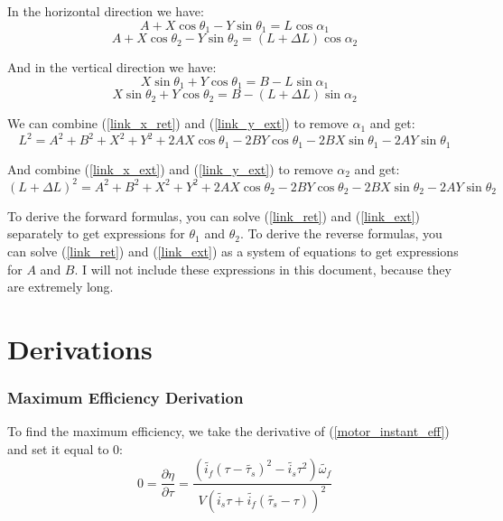 \documentclass[11pt,a4paper,titlepage]{article}
\begin{document}
	In the horizontal direction we have:
	\begin{equation} \label{link_x_ret}
		A + X \cos \theta_1 - Y \sin \theta_1 = L \cos \alpha_1
	\end{equation}
	\begin{equation} \label{link_x_ext}
		A + X \cos \theta_2 - Y \sin \theta_2 = (L + \Delta L) \cos \alpha_2
	\end{equation}
	
	And in the vertical direction we have:
	\begin{equation} \label{link_y_ret}
		X \sin \theta_1 + Y \cos \theta_1 = B - L \sin \alpha_1
	\end{equation}
	\begin{equation} \label{link_y_ext}
		X \sin \theta_2 + Y \cos \theta_2 = B - (L + \Delta L) \sin \alpha_2
	\end{equation}
	
	We can combine (\ref{link_x_ret}) and (\ref{link_y_ext}) to remove $\alpha_1$ and get:
	\begin{equation} \label{link_ret}
		L^2 = A^2 + B^2 + X^2 + Y^2 + 2AX \cos \theta_1 - 2BY \cos \theta_1 - 2BX \sin \theta_1 - 2AY \sin \theta_1
	\end{equation}
	
	And combine (\ref{link_x_ext}) and (\ref{link_y_ext}) to remove $\alpha_2$ and get:
	\begin{equation} \label{link_ext}
		(L + \Delta L)^2 = A^2 + B^2 + X^2 + Y^2 + 2AX \cos \theta_2 - 2BY \cos \theta_2 - 2BX \sin \theta_2 - 2AY \sin \theta_2
	\end{equation}
	
	To derive the forward formulas, you can solve (\ref{link_ret}) and (\ref{link_ext}) separately to get expressions for $\theta_1$ and $\theta_2$. To derive the reverse formulas, you can solve (\ref{link_ret}) and (\ref{link_ext}) as a system of equations to get expressions for $A$ and $B$. I will not include these expressions in this document, because they are extremely long.
	
	\newpage
	\appendix
	\part*{Derivations}
	\section{Maximum Efficiency Derivation} \label{max_eff_appendix}
	To find the maximum efficiency, we take the derivative of (\ref{motor_instant_eff}) and set it equal to 0:
	\begin{equation}
		0 = \frac{\partial \eta}{\partial \tau} = \frac{(\tilde{i_f} (\tau - \tilde{\tau_s})^2 - \tilde{i_s} \tau^2) \tilde{\omega_f}}{V (\tilde{i_s} \tau + \tilde{i_f} (\tilde{\tau_s} - \tau))^2}
	\end{equation}
	
\end{document}

